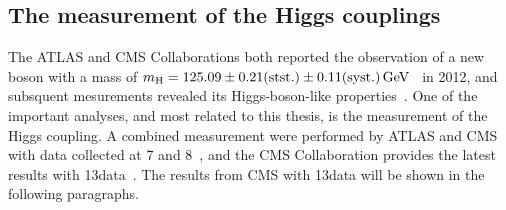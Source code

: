 \subsection{The measurement of the Higgs couplings}
The ATLAS and CMS Collaborations both reported the observation of a new boson with a mass of $m_{\mathrm{H}}=125.09\pm 0.21(\text{stst.})\pm 0.11(\text{syst.})\,\text{Ge\hspace{-.08em}V}$~\cite{Aad:2015zhl} in 2012, and subsquent mesurements revealed its Higgs-boson-like properties~\cite{Chatrchyan:2012jja,Khachatryan:2014kca,Aad:2012tfa,Chatrchyan:2012xdj,Chatrchyan:2013lba,Aad:2015gba,Khachatryan:2014jba,Aad:2013xqa}. One of the important analyses, and most related to this thesis, is the measurement of the Higgs coupling.  A combined measurement were performed by ATLAS and CMS with data collected at 7 and 8\TeV~\cite{Khachatryan:2016vau}, and the CMS Collaboration provides the latest results with 13\TeV data~\cite{CMS-PAS-HIG-17-031}. The results from CMS with 13\TeV data will be shown in the following paragraphs.

